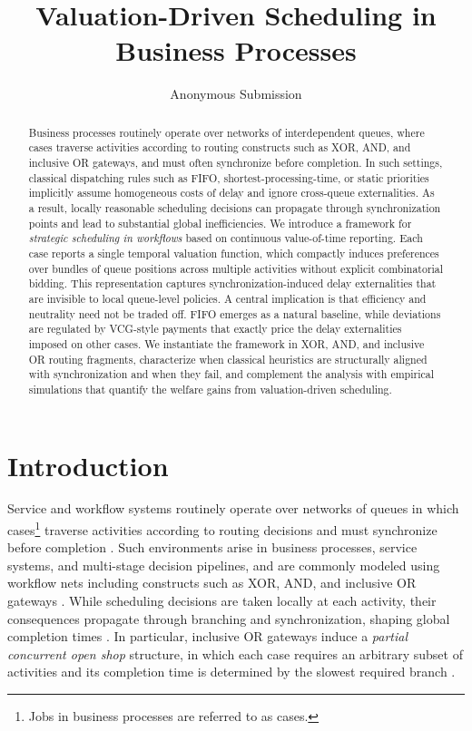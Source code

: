 \documentclass[letterpaper]{article}
\title{Valuation-Driven Scheduling in Business Processes}
\author{Anonymous Submission}
\begin{document}
\maketitle



\begin{abstract}
Business processes routinely operate over networks of interdependent queues, where cases traverse activities according to routing constructs such as XOR, AND, and inclusive OR gateways, and must often synchronize before completion. In such settings, classical dispatching rules such as FIFO, shortest-processing-time, or static priorities implicitly assume homogeneous costs of delay and ignore cross-queue externalities. As a result, locally reasonable scheduling decisions can propagate through synchronization points and lead to substantial global inefficiencies. We introduce a framework for \emph{strategic scheduling in workflows} based on continuous value-of-time reporting. Each case reports a single temporal valuation function, which compactly induces preferences over bundles of queue positions across multiple activities without explicit combinatorial bidding. This representation captures synchronization-induced delay externalities that are invisible to local queue-level policies. 
A central implication is that efficiency and neutrality need not be traded off. FIFO emerges as a natural baseline, while deviations are regulated by VCG-style payments that exactly price the delay externalities imposed on other cases. We instantiate the framework in XOR, AND, and inclusive OR routing fragments, characterize when classical heuristics are structurally aligned with synchronization and when they fail, and complement the analysis with empirical simulations that quantify the welfare gains from valuation-driven scheduling.
\end{abstract}


\section{Introduction}

Service and workflow systems routinely operate over networks of queues in which cases\footnote{Jobs in business processes are referred to as cases.} traverse activities according to routing decisions and must synchronize before completion \citep{shortle2018fundamentals}. Such environments arise in business processes, service systems, and multi-stage decision pipelines, and are commonly modeled using workflow nets including constructs such as XOR, AND, and inclusive OR gateways \citep{dumas2018fundamentals}.
While scheduling decisions are taken locally at each activity, their consequences propagate through branching and synchronization, shaping global completion times
\citep{harrison2000brownian}. In particular, inclusive OR gateways induce a \emph{partial concurrent open shop} structure, in which each case requires an arbitrary subset of activities and its completion time is determined by the slowest required branch
\citep{graham1979optimization,senderovich2016conformance}.
\end{document}
